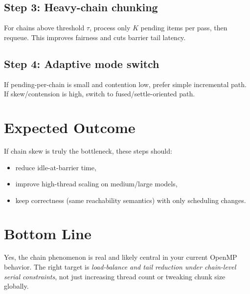 \documentclass[11pt,a4paper]{article}
\begin{document}
\subsection*{Step 3: Heavy-chain chunking}
For chains above threshold $\tau$, process only $K$ pending items per pass, then requeue.
This improves fairness and cuts barrier tail latency.

\subsection*{Step 4: Adaptive mode switch}
If pending-per-chain is small and contention low, prefer simple incremental path.
If skew/contension is high, switch to fused/settle-oriented path.

\section{Expected Outcome}
If chain skew is truly the bottleneck, these steps should:
\begin{itemize}
  \item reduce idle-at-barrier time,
  \item improve high-thread scaling on medium/large models,
  \item keep correctness (same reachability semantics) with only scheduling changes.
\end{itemize}

\section{Bottom Line}
Yes, the chain phenomenon is real and likely central in your current OpenMP behavior.
The right target is \emph{load-balance and tail reduction under chain-level serial constraints}, not just increasing thread count or tweaking chunk size globally.
\end{document}
